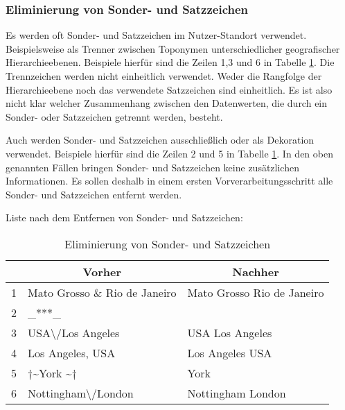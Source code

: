 			\subsubsection{Eliminierung von Sonder- und Satzzeichen} 

				Es werden oft Sonder- und Satzzeichen im Nutzer-Standort verwendet. 
				Beispielsweise als Trenner zwischen Toponymen unterschiedlicher geografischer Hierarchieebenen.
				Beispiele hierfür sind die Zeilen 1,3 und 6 in Tabelle \ref{tab:VorverarbeitungSonder}. 
				Die Trennzeichen werden nicht einheitlich verwendet.
				Weder die Rangfolge der Hierarchieebene noch das verwendete Satzzeichen sind einheitlich.  
				Es ist also nicht klar welcher Zusammenhang zwischen den Datenwerten, die durch ein Sonder- oder Satzzeichen getrennt werden, besteht. 

				Auch werden Sonder- und Satzzeichen ausschließlich oder als Dekoration verwendet.
				Beispiele hierfür sind die Zeilen 2 und 5 in Tabelle \ref{tab:VorverarbeitungSonder}.
				In den oben genannten Fällen bringen Sonder- und Satzzeichen keine zusätzlichen Informationen.
				Es sollen deshalb in einem ersten Vorverarbeitungsschritt alle Sonder- und Satzzeichen entfernt werden. 

				Liste nach dem Entfernen von Sonder- und Satzzeichen:

				\begin{table}[h]
				\centering
				\caption{Eliminierung von Sonder- und Satzzeichen}
				\label{tab:VorverarbeitungSonder}
				\begin{tabular}{|l|l|l|}
				\hline 
				  & \multicolumn{1}{c|}{\textbf{Vorher}} & \multicolumn{1}{c|}{\textbf{Nachher}} \\ \hline \hline
				1 & Mato Grosso \& Rio de Janeiro        & Mato Grosso Rio de Janeiro            \\ \hline
				2 & \_***\_                              &                                       \\ \hline
				3 & USA\textbackslash /Los Angeles       & USA Los Angeles                       \\ \hline
				4 & Los Angeles, USA                     & Los Angeles USA                       \\ \hline
				5 & $\dagger$\textasciitilde York \textasciitilde$\dagger$                             & York                                  \\ \hline
				6 & Nottingham\textbackslash /London     & Nottingham London                     \\ \hline
				\end{tabular}
				\end{table}

